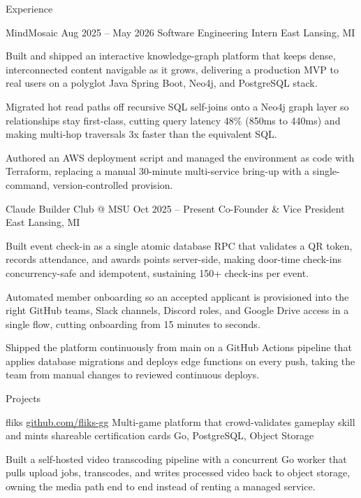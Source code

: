 \documentclass[
	11pt
]{../../../template}
\begin{document}
\begin{rSection}{E}{xperience}
		\begin{rSectionEntry}
			{MindMosaic}
			{Aug 2025 -- May 2026}
			{Software Engineering Intern}
			{}
			{East Lansing, MI}

			\item Built and shipped an interactive knowledge-graph platform that keeps dense, interconnected content navigable as it grows, delivering a production MVP to real users on a polyglot Java Spring Boot, Neo4j, and PostgreSQL stack.
			\item Migrated hot read paths off recursive SQL self-joins onto a Neo4j graph layer so relationships stay first-class, cutting query latency 48\% (850ms to 440ms) and making multi-hop traversals 3x faster than the equivalent SQL.
			\item Authored an AWS deployment script and managed the environment as code with Terraform, replacing a manual 30-minute multi-service bring-up with a single-command, version-controlled provision.
		\end{rSectionEntry}

		\begin{rSectionEntry}
			{Claude Builder Club @ MSU}
			{Oct 2025 -- Present}
			{Co-Founder \& Vice President}
			{}
			{East Lansing, MI}

			\item Built event check-in as a single atomic database RPC that validates a QR token, records attendance, and awards points server-side, making door-time check-ins concurrency-safe and idempotent, sustaining 150+ check-ins per event.
			\item Automated member onboarding so an accepted applicant is provisioned into the right GitHub teams, Slack channels, Discord roles, and Google Drive access in a single flow, cutting onboarding from 15 minutes to seconds.
			\item Shipped the platform continuously from main on a GitHub Actions pipeline that applies database migrations and deploys edge functions on every push, taking the team from manual changes to reviewed continuous deploys.
		\end{rSectionEntry}
	\end{rSection}

	\begin{rSection}{P}{rojects}
		\begin{rSectionEntry}
			{fliks}
			{\href{https://github.com/fliks-gg}{github.com/fliks-gg}}
			{Multi-game platform that crowd-validates gameplay skill and mints shareable certification cards}
			{Go, PostgreSQL, Object Storage}
			{}

			\item Built a self-hosted video transcoding pipeline with a concurrent Go worker that pulls upload jobs, transcodes, and writes processed video back to object storage, owning the media path end to end instead of renting a managed service.
		\end{rSectionEntry}
	\end{rSection}
\end{document}
